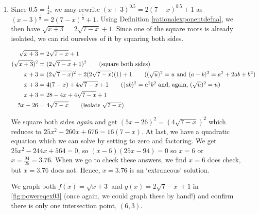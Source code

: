 \begin{ex}
\begin{enumerate}
\item Since $0.5 = \frac{1}{2}$, we may rewrite $(x+3)^{0.5} = 2(7-x)^{0.5}+1$ as  $(x+3)^{\frac{1}{2}} = 2(7-x)^{\frac{1}{2}}+1$.  Using Definition \ref{rationalexponentdefna}, we then have $\sqrt{x+3} = 2\sqrt{7-x} + 1$.  Since one of the square roots is already isolated, we can rid ourselves of it by squaring both sides.

\begin{align*}
\sqrt{x+3} & = 2\sqrt{7-x} + 1 \\
 (\sqrt{x+3})^2 & = (2\sqrt{7-x} + 1)^2 \tag{square both sides} \\
 x+3 & = (2 \sqrt{7-x})^2 + 2 (2 \sqrt{7-x})(1) + 1 \tag{$(\sqrt{u})^2 = u$ and $(a+b)^2 = a^2 + 2ab +b^2$} \\
 x+3 & = 4(7-x) + 4\sqrt{7-x} + 1 \tag{$(ab)^2 = a^2b^2$ and, again, $(\sqrt{u})^2 = u$} \\
 x+3 & = 28-4x+4\sqrt{7-x} + 1 \\
 5x-26 & = 4\sqrt{7-x} \tag{isolate $\sqrt{7-x}$}
\end{align*}
 
We square both sides \textit{again} and get $(5x-26)^2 = (4\sqrt{7-x})^2$ which reduces to $25x^2-260x+676 = 16(7-x)$. At last, we have a quadratic equation which we can solve by setting to zero and factoring.  We get  $25x^2-244x+564 = 0$, so $(x-6)(25x-94) = 0$ so $x = 6$ or $x = \frac{94}{25} = 3.76$.  When we go to check these answers, we find $x=6$ does check, but $x = 3.76$ does not. Hence, $x=3.76$ is an `extraneous' solution.

We graph both $f(x) = \sqrt{x+3}$ and $g(x) = 2\sqrt{7-x} + 1$ in \autoref{fig:powereqex03} (once again, we could graph these by hand!) and confirm there is only one intersection point, $(6,3)$.


\end{enumerate}
\end{ex}

